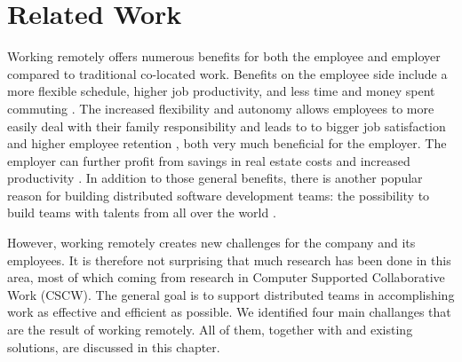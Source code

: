 \chapter{Related Work}
Working remotely offers numerous benefits for both the employee and employer compared to traditional co-located work. Benefits on the employee side include a more flexible schedule, higher job productivity, and less time and money spent commuting \autocite{flores2019understanding, mulki2009set}. The increased flexibility and autonomy allows employees to more easily deal with their family responsibility and leads to to bigger job satisfaction and higher employee retention \autocite{mulki2009set, gajendran2007good, madsen2011benefits}, both very much beneficial for the employer. The employer can further profit from savings in real estate costs and increased productivity \autocite{mulki2009set}. In addition to those general benefits, there is another popular reason for building distributed software development teams: the possibility to build teams with talents from all over the world \autocite{carmel1999global}.

However, working remotely creates new challenges for the company and its employees. It is therefore not surprising that much research has been done in this area, most of which coming from research in Computer Supported Collaborative Work (CSCW). The general goal is to support distributed teams in accomplishing work as effective and efficient as possible. We identified four main challanges that are the result of working remotely. All of them, together with and existing solutions, are discussed in this chapter.



